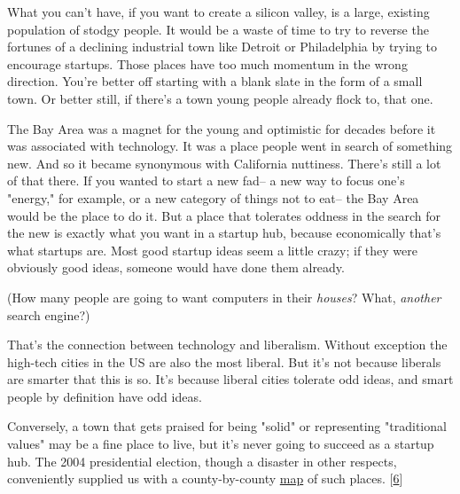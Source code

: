 What
                  you can't have, if you want to create a silicon valley, is a
                  large, existing population of stodgy people. It would be a
                  waste of time to try to reverse the fortunes of a declining
                  industrial town like Detroit or Philadelphia by trying to
                  encourage startups. Those places have too much momentum in the
                  wrong direction. You're better off starting with a blank slate
                  in the form of a small town. Or better still, if there's a
                  town young people already flock to, that one.

The
                  Bay Area was a magnet for the young and optimistic for decades
                  before it was associated with technology. It was a place
                  people went in search of something new. And so it became
                  synonymous with California nuttiness. There's still a lot of
                  that there. If you wanted to start a new fad-- a new way to
                  focus one's "energy," for example, or a new category of things
                  not to eat-- the Bay Area would be the place to do it. But a
                  place that tolerates oddness in the search for the new is
                  exactly what you want in a startup hub, because economically
                  that's what startups are. Most good startup ideas seem a
                  little crazy; if they were obviously good ideas, someone would
                  have done them already.

(How many people are going
                  to want computers in their \emph{houses}? What,
                  \emph{another} search engine?)

That's the
                  connection between technology and liberalism. Without
                  exception the high-tech cities in the US are also the most
                  liberal. But it's not because liberals are smarter that this
                  is so. It's because liberal cities tolerate odd ideas, and
                  smart people by definition have odd ideas.

Conversely,
                  a town that gets praised for being "solid" or representing
                  "traditional values" may be a fine place to live, but it's
                  never going to succeed as a startup hub. The 2004 presidential
                  election, though a disaster in other respects, conveniently
                  supplied us with a county-by-county
                  \href{http://www-personal.umich.edu/\textasciitilde{}mejn/election/2004/countymaplinearlarge.png}{
                    map}
                  of such places.
                  [\href{\#f6n}{6}]

